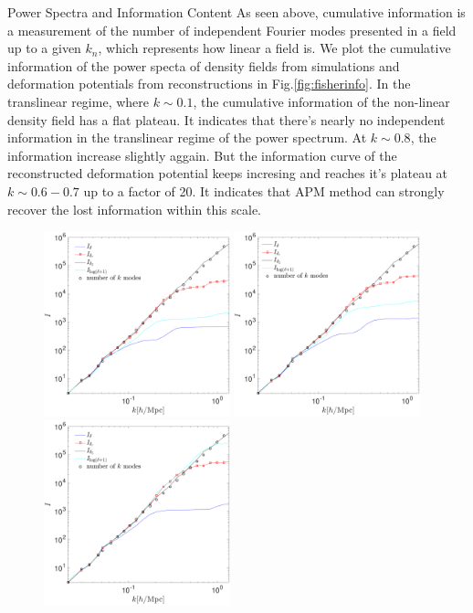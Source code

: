 \begin{section}{Power Spectra and Information Content}
  As seen above, cumulative information is a measurement of the number of independent Fourier modes 
presented in a field up to a given $k_n$, which represents how linear a field is. We plot the 
cumulative information of the power specta of density fields from simulations and deformation 
potentials from reconstructions in Fig.\ref{fig:fisherinfo}. In the translinear regime, where 
$k\sim0.1$, the cumulative information of the non-linear density field has a flat plateau. It 
indicates that there's nearly no independent information in the translinear regime of the power 
spectrum. At $k\sim0.8$, the information increase slightly aggain. But the information curve of 
the reconstructed deformation potential keeps incresing and reaches it's plateau at $k\sim0.6-0.7$ 
up to a factor of 20. It indicates that APM method can strongly recover the lost information within this scale. 
\begin{figure}[t!]
 \begin{center}
  \includegraphics[width=0.48\textwidth]{fisher_addlog_r2-crop.pdf}
  \includegraphics[width=0.48\textwidth]{fisher_addlog_r-crop.pdf}
  \includegraphics[width=0.48\textwidth]{fisher_addlog-crop.pdf}

\end{center}
\end{figure}
\end{section}

